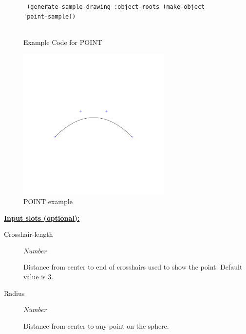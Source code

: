 \documentclass [11pt]{book}
\begin{document}
\begin{itemize}
\begin{figure}
\begin{lrbox}{\boxedverb}
\begin{minipage}{\linewidth}
{\begin{verbatim}
 (generate-sample-drawing :object-roots (make-object 'point-sample))


\end{verbatim}}
\end{minipage}
\end{lrbox}
\fbox{\usebox{\boxedverb}}

\caption{Example Code for POINT}

\label{fig:example-code-POINT}

\end{figure}

\begin{figure}
\begin{center}
\includegraphics[width=3in,height=3in]{../images/example-POINT.pdf}
\end{center}

\caption{POINT example}

\label{fig:POINT}

\end{figure}





\textbf{
\underline{Input slots (optional):}}

\begin{description}

\item [Crosshair-length]
\emph{Number}

 Distance from center to end of crosshairs used to show the point. Default value is 3.




\item [Radius]
\emph{Number}

 Distance from center to any point on the sphere.





\end{description}
\end{itemize}
\end{document}
